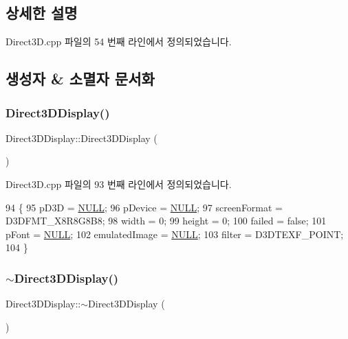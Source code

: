 \subsection{상세한 설명}


Direct3\+D.\+cpp 파일의 54 번째 라인에서 정의되었습니다.



\subsection{생성자 \& 소멸자 문서화}
\mbox{\label{class_direct3_d_display_affbd75238a993397fd512e42e7299bc0}} 
\subsubsection{\texorpdfstring{Direct3\+D\+Display()}{Direct3DDisplay()}}
{\footnotesize\ttfamily Direct3\+D\+Display\+::\+Direct3\+D\+Display (\begin{DoxyParamCaption}{ }\end{DoxyParamCaption})}



Direct3\+D.\+cpp 파일의 93 번째 라인에서 정의되었습니다.


\begin{DoxyCode}
94 \{
95     pD3D = \mbox{\hyperlink{getopt1_8c_a070d2ce7b6bb7e5c05602aa8c308d0c4}{NULL}};  
96     pDevice = \mbox{\hyperlink{getopt1_8c_a070d2ce7b6bb7e5c05602aa8c308d0c4}{NULL}};
97     screenFormat = D3DFMT\_X8R8G8B8;
98     width = 0;
99     height = 0;
100     failed = \textcolor{keyword}{false};
101     pFont = \mbox{\hyperlink{getopt1_8c_a070d2ce7b6bb7e5c05602aa8c308d0c4}{NULL}};
102     emulatedImage = \mbox{\hyperlink{getopt1_8c_a070d2ce7b6bb7e5c05602aa8c308d0c4}{NULL}};
103     filter = D3DTEXF\_POINT;
104 \}
\end{DoxyCode}
\mbox{\label{class_direct3_d_display_a11987c1fc63954e5cdf7efa717631554}} 
\subsubsection{\texorpdfstring{$\sim$\+Direct3\+D\+Display()}{~Direct3DDisplay()}}
{\footnotesize\ttfamily Direct3\+D\+Display\+::$\sim$\+Direct3\+D\+Display (\begin{DoxyParamCaption}{ }\end{DoxyParamCaption})\hspace{0.3cm}{\ttfamily [virtual]}}



